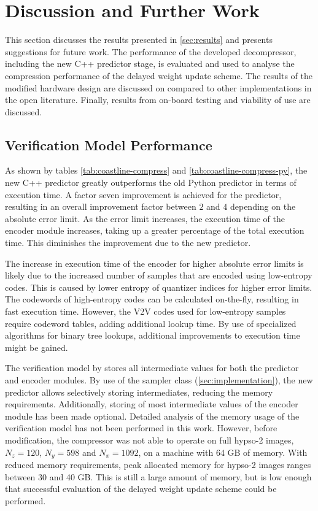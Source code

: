 \chapter{Discussion and Further Work}
\label{sec:discussion}

This section discusses the results presented in \autoref{sec:results} and presents suggestions for future work. The performance of the developed decompressor, including the new C++ predictor stage, is evaluated and used to analyse the compression performance of the delayed weight update scheme. The results of the modified hardware design are discussed on compared to other implementations in the open literature. Finally, results from on-board testing and viability of use are discussed.

\section{Verification Model Performance}

As shown by tables \ref{tab:coastline-compress} and \ref{tab:coastline-compress-py}, the new C++ predictor greatly outperforms the old Python predictor in terms of execution time. A factor seven improvement is achieved for the predictor, resulting in an overall improvement factor between $2$ and $4$ depending on the absolute error limit. As the error limit increases, the execution time of the encoder module increases, taking up a greater percentage of the total execution time. This diminishes the improvement due to the new predictor.

The increase in execution time of the encoder for higher absolute error limits is likely due to the increased number of samples that are encoded using low-entropy codes. This is caused by lower entropy of quantizer indices for higher error limits. The codewords of high-entropy codes can be calculated on-the-fly, resulting in fast execution time. However, the \acrshort{V2V} codes used for low-entropy samples require codeword tables, adding additional lookup time. By use of specialized algorithms for binary tree lookups, additional improvements to execution time might be gained.

The verification model by \citeauthor{vorhaugHyperspectralImageCompression2024} stores all intermediate values for both the predictor and encoder modules. By use of the sampler class (\autoref{sec:implementation}), the new predictor allows selectively storing intermediates, reducing the memory requirements. Additionally, storing of most intermediate values of the encoder module has been made optional. Detailed analysis of the memory usage of the verification model has not been performed in this work. However, before modification, the compressor was not able to operate on full \acrshort{hypso}-2 images, $N_z=120$, $N_y=598$ and $N_x=1092$, on a machine with 64 GB of memory. With reduced memory requirements, peak allocated memory for \acrshort{hypso}-2 images ranges between 30 and 40 GB. This is still a large amount of memory, but is low enough that successful evaluation of the delayed weight update scheme could be performed.

